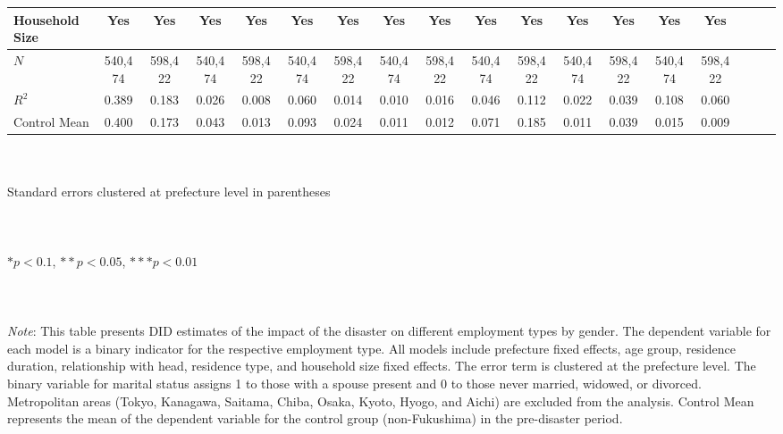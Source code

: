 \documentclass[serif, aspectratio=169]{beamer}
\newcommand{\differentemploymenttypeslinks}{%
    \vfill %
    \hfill %
    {\small %
        \hyperlink{different_types_placebo}{\beamerbutton{Placebo test}} \,
    }
}
\begin{document}
\begin{frame}[label=different_types]
\begin{table}[htbp]
{\begin{tabular}{@{}l*{17}{c}@{}}
\addlinespace
Household Size &      Yes         &      Yes         &      Yes         &      Yes         &      Yes         &      Yes         &      Yes         &      Yes         &      Yes         &      Yes         &      Yes         &      Yes         &      Yes         &      Yes         \\
\midrule
$\textit{N}$&  540,474         &  598,422         &  540,474         &  598,422         &  540,474         &  598,422         &  540,474         &  598,422         &  540,474         &  598,422         &  540,474         &  598,422         &  540,474         &  598,422         \\
$\textit{R}^2$&    0.389         &    0.183         &    0.026         &    0.008         &    0.060         &    0.014         &    0.010         &    0.016         &    0.046         &    0.112         &    0.022         &    0.039         &    0.108         &    0.060         \\
Control Mean&    0.400         &    0.173         &    0.043         &    0.013         &    0.093         &    0.024         &    0.011         &    0.012         &    0.071         &    0.185         &    0.011         &    0.039         &    0.015         &    0.009         \\
\bottomrule
\end{tabular}}
\raggedright
\\\\{\linewidth}{\tiny Standard errors clustered at prefecture level in parentheses}\\\\
\vspace{-0.2cm}
\\\\{\linewidth}{\tiny $*p<0.1$, $**p<0.05$, $***p<0.01$}\\\\
\\\\{\linewidth}{\tiny \textit{Note}: This table presents DID estimates of the impact of the disaster on different employment types by gender. The dependent variable for each model is a binary indicator for the respective employment type. All models include prefecture fixed effects, age group, residence duration, relationship with head, residence type, and household size fixed effects. The error term is clustered at the prefecture level. The binary variable for marital status assigns 1 to those with a spouse present and 0 to those never married, widowed, or divorced. Metropolitan areas (Tokyo, Kanagawa, Saitama, Chiba, Osaka, Kyoto, Hyogo, and Aichi) are excluded from the analysis. Control Mean represents the mean of the dependent variable for the control group (non-Fukushima) in the pre-disaster period.}
\end{table}

\vspace{-3.2cm}
\differentemploymenttypeslinks

\end{frame}
\end{document}

